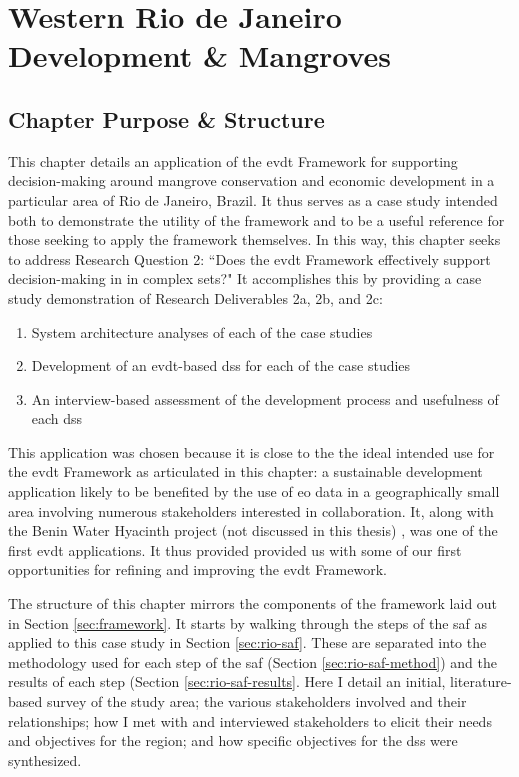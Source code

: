 \chapter{Western Rio de Janeiro Development \& Mangroves} \label{ch:mangroves}

\section{Chapter Purpose \& Structure}

This chapter details an application of the \acf{evdt} Framework for supporting decision-making around mangrove conservation and economic development in a particular area of Rio de Janeiro, Brazil. It thus serves as a case study intended both to demonstrate the utility of the framework and to be a useful reference for those seeking to apply the framework themselves. In this way, this chapter seeks to address Research Question 2: ``Does the \ac{evdt} Framework effectively support decision-making in in complex \ac{sets}?" It accomplishes this by providing a case study demonstration of Research Deliverables 2a, 2b, and 2c: 

\begin{enumerate}[label=\emph{\alph*},itemsep=0pt,parsep=0pt]
	\item{System architecture analyses of each of the case studies} 
	\item{Development of an \ac{evdt}-based \acf{dss} for each of the case studies} 
	\item{An interview-based assessment of the development process and usefulness of each \ac{dss}} 
\end{enumerate}


This application was chosen because it is close to the the ideal intended use for the \ac{evdt} Framework as articulated in this chapter: a sustainable development application likely to be benefited by the use of \acf{eo} data in a geographically small area involving numerous stakeholders interested in collaboration. It, along with the Benin Water Hyacinth project (not discussed in this thesis) \cite{ovienmhadaEarthObservationTechnology2020, ovienmhadaInclusiveDesignEarth2021}, was one of the first \ac{evdt} applications. It thus provided provided us with some of our first opportunities for refining and improving the \ac{evdt} Framework.
	
The structure of this chapter mirrors the components of the framework laid out in Section \ref{sec:framework}. It starts by walking through the steps of the \acf{saf} as applied to this case study in Section \ref{sec:rio-saf}. These are separated into the methodology used for each step of the \ac{saf} (Section \ref{sec:rio-saf-method}) and the results of each step (Section \ref{sec:rio-saf-results}. Here I detail an initial, literature-based survey of the study area; the various stakeholders involved and their relationships; how I met with and interviewed stakeholders to elicit their needs and objectives for the region; and how specific objectives for the \ac{dss} were synthesized. 

